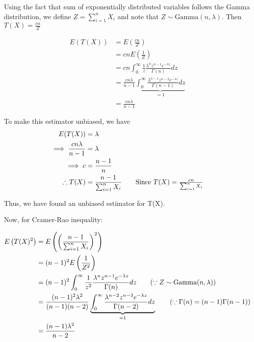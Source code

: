 \documentclass[12pt, oneside]{article}
\begin{document}
\begin{enumerate}
{  Using the fact that sum of exponentially distributed variables follows the Gamma distribution,
  we define \(Z = \sum_{i = 1}^{n} X_i\) and note that \(Z \sim \text{Gamma}(n, \lambda)\).
  Then \(T(X) = \frac{cn}{Z}\)

  \begin{align*}
    E(T(X)) &= E\left(\frac{cn}{Z}\right) \\
            &= cn E\left(\frac{1}{Z}\right) \\
            &= cn \int_{0}^{\infty} \frac{1}{z} \frac{\lambda^n z^{n-1} e^{-\lambda z}}{\Gamma(n)} dz \tag*{(\(\because Z \sim Gamma(n, \lambda)\))} \\
            &= \frac{cn\lambda}{n-1} \underbrace{\int_{0}^{\infty} \frac{\lambda^{n-1} z^{n-2} e^{-\lambda z}}{\Gamma(n-1)} dz}_{ = 1} \tag*{(\(\because \Gamma(n) = (n-1) \Gamma(n-1)\))} \\
            &= \frac{cn\lambda}{n-1}
  \end{align*}

  To make this estimator unbiased, we have
  \begin{align*}
    E(T(X)) &= \lambda \\
    \implies \frac{cn\lambda}{n-1} &= \lambda \\
    \implies c &= \frac{n-1}{n} \\
    \therefore T(X) &= \frac{n - 1}{\sum_{i=1}^{n} X_i} \tag*{Since \(T(X) = \frac{cn}{\sum_{i=1}^{n} X_i}\)}
  \end{align*}

  Thus, we have found an unbiased estimator for T(X).

  Now, for Cramer-Rao inequality:

  \begin{align*}
    E\left(T(X)^2\right) &= E\left(\left(\frac{n-1}{\sum_{i=1}^{n} X_i}\right)^2\right) \\
      &= (n - 1)^2 E\left(\frac{1}{Z^2}\right) \\
      &= (n - 1)^2 \int_{0}^{\infty} \frac{1}{z^2} \frac{\lambda^n z^{n-1} e^{-\lambda z}}{\Gamma(n)} dz \tag*{(\(\because Z \sim \text{Gamma}(n, \lambda)\))} \\
      &= \frac{(n - 1)^2 \lambda^2}{(n - 1)(n - 2)}\underbrace{\int_{0}^{\infty}\frac{\lambda^{n-2} z^{n-3} e^{-\lambda z}}{\Gamma(n-2)} dz}_{=1} \tag*{(\(\because \Gamma(n) = (n-1) \Gamma(n-1)\))} \\
      &= \frac{(n - 1) \lambda^2}{n - 2}
  \end{align*}

}
\end{enumerate}
\end{document}
